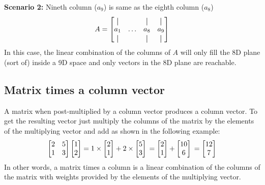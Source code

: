 \documentclass[../main.tex]{subfiles}
\begin{document}
\textbf{Scenario 2:} Nineth column (\(a_{9}\)) is same as the eighth column (\(a_{8}\))
\[
    A
    =
    \begin{bmatrix}
        \vertbar &       & \vertbar & \vertbar \\
        a_{1}    & \dots & a_{8}    & a_{9}    \\
        \vertbar &       & \vertbar & \vertbar \\
    \end{bmatrix}
\]
In this case, the linear combination of the columns of \(A\) will only fill the 8D plane (sort of) inside a 9D space and only vectors in the 8D plane are reachable.


\subsection{Matrix times a column vector}
A matrix when post-multiplied by a column vector produces a column vector. To get the resulting vector just multiply the columns of the matrix by the elements of the multiplying vector and add as shown in the following example:
\[
    \begin{bmatrix}
        2 & 5 \\
        1 & 3
    \end{bmatrix}
    \begin{bmatrix}
        1 \\
        2
    \end{bmatrix}
    =
    1 \times
    \begin{bmatrix}
        2 \\
        1
    \end{bmatrix}
    +
    2 \times
    \begin{bmatrix}
        5 \\
        3
    \end{bmatrix} \\
    =
    \begin{bmatrix}
        2 \\
        1
    \end{bmatrix}
    +
    \begin{bmatrix}
        10 \\
        6
    \end{bmatrix}\\
    =
    \begin{bmatrix}
        12 \\
        7
    \end{bmatrix}
\]
In other words, a matrix times a column is a linear combination of the columns of the matrix with weights provided by the elements of the multiplying vector.


\end{document}
